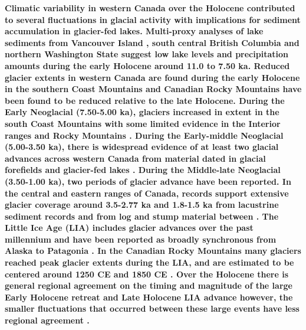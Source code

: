 \documentclass[Royal,times,doublespace,sageh]{sagej}
\begin{document}
\textbf{Climatic variability in western Canada over the Holocene
contributed to several fluctuations in glacial activity with
implications for sediment accumulation in glacier-fed lakes. Multi-proxy
analyses of lake sediments from Vancouver Island \citep{Brown2006},
south central British Columbia \citep{Lowe1997} and northern Washington
State \citep{Steinman2019} suggest low lake levels and precipitation
amounts during the early Holocene around 11.0 to 7.50 ka. Reduced
glacier extents in western Canada are found during the early Holocene in
the southern Coast Mountains \citep{Menounos2004, Koch2007a, Osborn2007}
and Canadian Rocky Mountains \citep{Luckman1988, Luckman1993} have been
found to be reduced relative to the late Holocene. During the Early
Neoglacial (7.50-5.00 ka), glaciers increased in extent in the south
Coast Mountains
\citep{Osborn2007, Filippelli2006, Ryder1986, Harvey2012} with some
limited evidence in the Interior ranges and Rocky Mountains
\citep{Luckman1993}. During the Early-middle Neoglacial (5.00-3.50 ka),
there is widespread evidence of at least two glacial advances across
western Canada from material dated in glacial forefields and glacier-fed
lakes
\citep{Koch2007a, Osborn2007, Menounos2008c, Gardner1985, Wood2004, Hodder2006b, Desloges1999, Leonard1999}.
During the Middle-late Neoglacial (3.50-1.00 ka), two periods of glacier
advance have been reported. In the central and eastern ranges of Canada,
records support extensive glacier coverage around 3.5-2.77 ka and
1.8-1.5 ka from lacustrine sediment records
\citep{Leonard1999, Leonard1997, Dirszowsky1997a, Desloges1999} and from
log and stump material between
\citep{Wood2004, Luckman1995, Luckman1999}. The Little Ice Age (LIA)
includes glacier advances over the past millennium and have been
reported as broadly synchronous from Alaska to Patagonia
\citep{Luckman2000g}. In the Canadian Rocky Mountains many glaciers
reached peak glacier extents during the LIA, and are estimated to be
centered around 1250 CE \citep{Luckman1995, Osborn2001, Leonard1997} and
1850 CE \citep{Luckman2000e, Leonard1997}. Over the Holocene there is
general regional agreement on the timing and magnitude of the large
Early Holocene retreat and Late Holocene LIA advance however, the
smaller fluctuations that occurred between these large events have less
regional agreement \citep{Menounos2009b}. }
\end{document}
